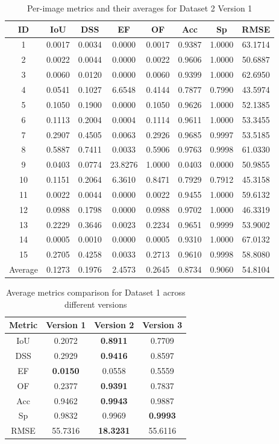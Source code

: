 \documentclass[12pt]{article}
\begin{document}
\begin{table}[h!]
\centering
\begin{tabular}{|c|c|c|c|c|c|c|c|}
\hline
ID & IoU & DSS & EF & OF & Acc & Sp & RMSE \\
\hline
1 & 0.0017 & 0.0034 & 0.0000 & 0.0017 & 0.9387 & 1.0000 & 63.1714 \\
2 & 0.0022 & 0.0044 & 0.0000 & 0.0022 & 0.9606 & 1.0000 & 50.6887 \\
3 & 0.0060 & 0.0120 & 0.0000 & 0.0060 & 0.9399 & 1.0000 & 62.6950 \\
4 & 0.0541 & 0.1027 & 6.6548 & 0.4144 & 0.7877 & 0.7990 & 43.5974 \\
5 & 0.1050 & 0.1900 & 0.0000 & 0.1050 & 0.9626 & 1.0000 & 52.1385 \\
6 & 0.1113 & 0.2004 & 0.0004 & 0.1114 & 0.9611 & 1.0000 & 53.3455 \\
7 & 0.2907 & 0.4505 & 0.0063 & 0.2926 & 0.9685 & 0.9997 & 53.5185 \\
8 & 0.5887 & 0.7411 & 0.0033 & 0.5906 & 0.9763 & 0.9998 & 61.0330 \\
9 & 0.0403 & 0.0774 & 23.8276 & 1.0000 & 0.0403 & 0.0000 & 50.9855 \\
10 & 0.1151 & 0.2064 & 6.3610 & 0.8471 & 0.7929 & 0.7912 & 45.3158 \\
11 & 0.0022 & 0.0044 & 0.0000 & 0.0022 & 0.9455 & 1.0000 & 59.6132 \\
12 & 0.0988 & 0.1798 & 0.0000 & 0.0988 & 0.9702 & 1.0000 & 46.3319 \\
13 & 0.2229 & 0.3646 & 0.0023 & 0.2234 & 0.9651 & 0.9999 & 53.9002 \\
14 & 0.0005 & 0.0010 & 0.0000 & 0.0005 & 0.9310 & 1.0000 & 67.0132 \\
15 & 0.2705 & 0.4258 & 0.0033 & 0.2713 & 0.9610 & 0.9998 & 58.8080 \\
\hline
Average & 0.1273 & 0.1976 & 2.4573 & 0.2645 & 0.8734 & 0.9060 & 54.8104 \\
\hline
\end{tabular}
\caption{Per-image metrics and their averages for Dataset 2 Version 1}
\end{table}



\begin{table}[h]
\centering
\begin{tabular}{|c|c|c|c|}
\hline
Metric & Version 1 & Version 2 & Version 3 \\
\hline
IoU & 0.2072 & \textbf{0.8911} & 0.7709 \\
DSS & 0.2929 & \textbf{0.9416} & 0.8597 \\
EF & \textbf{0.0150} & 0.0558 & 0.5559 \\
OF & 0.2377 & \textbf{0.9391} & 0.7837 \\
Acc & 0.9462 & \textbf{0.9943} & 0.9887 \\
Sp & 0.9832 & 0.9969 & \textbf{0.9993} \\
RMSE & 55.7316 & \textbf{18.3231} & 55.6116 \\
\hline
\end{tabular}
\caption{Average metrics comparison for Dataset 1 across different versions}
\end{table}
\end{document}

